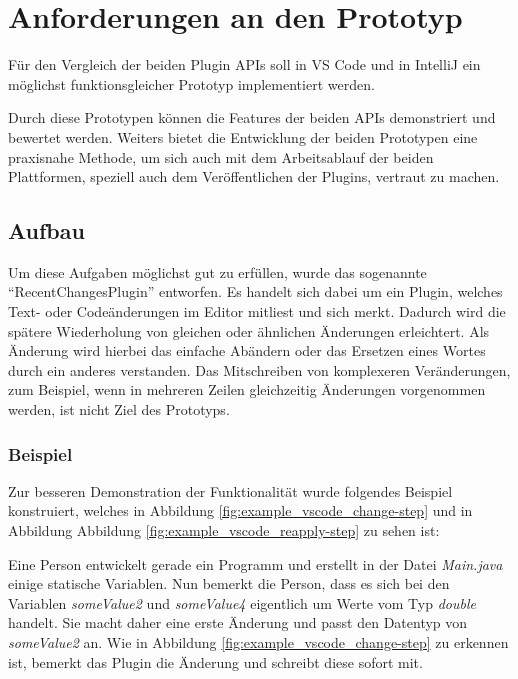 \chapter{Anforderungen an den Prototyp}
\label{cha:Prototyp}

Für den Vergleich der beiden Plugin APIs soll 
in VS Code und in IntelliJ ein möglichst funktionsgleicher 
Prototyp implementiert werden.

Durch diese Prototypen können die Features der beiden APIs 
demonstriert und bewertet werden. Weiters bietet die Entwicklung
der beiden Prototypen
eine praxisnahe Methode, um sich auch mit dem Arbeitsablauf der
beiden Plattformen, speziell auch dem Veröffentlichen
der Plugins, vertraut zu machen.

\section{Aufbau}
\label{sec:Prototyp_Aufbau}

Um diese Aufgaben möglichst gut zu erfüllen, wurde das sogenannte
\enquote{RecentChangesPlugin} entworfen. Es handelt sich 
dabei um ein Plugin, welches Text- oder Codeänderungen 
im Editor mitliest und sich merkt. Dadurch wird die spätere
Wiederholung von gleichen oder ähnlichen Änderungen erleichtert. %
Als Änderung wird hierbei das einfache Abändern oder das Ersetzen eines
Wortes durch ein anderes verstanden. 
Das Mitschreiben von komplexeren Veränderungen, zum Beispiel, 
wenn in mehreren Zeilen gleichzeitig Änderungen vorgenommen 
werden, ist nicht Ziel des Prototyps.

\subsection{Beispiel}

Zur besseren Demonstration der Funktionalität wurde folgendes 
Beispiel konstruiert, welches in Abbildung \ref{fig:example_vscode_change-step}
und in Abbildung Abbildung \ref{fig:example_vscode_reapply-step}
zu sehen ist:

Eine Person entwickelt gerade ein Programm und erstellt 
in der Datei \emph{Main.java} einige statische Variablen.
Nun bemerkt die Person, dass es sich bei den Variablen 
\emph{someValue2} und \emph{someValue4} eigentlich um 
Werte vom Typ \emph{double} handelt. Sie macht daher eine 
erste Änderung und passt den Datentyp von \emph{someValue2} an.
Wie in Abbildung \ref{fig:example_vscode_change-step} zu erkennen ist,
bemerkt das Plugin die Änderung und schreibt diese sofort mit.

